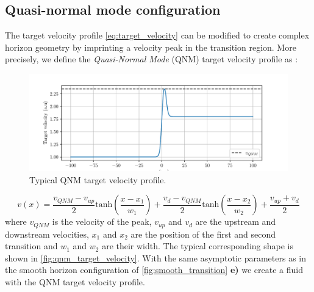 \subsection{Quasi-normal mode configuration}

The target velocity profile \autoref{eq:target_velocity} can be modified to create complex horizon geometry by imprinting 
a velocity peak in the transition region. More precisely, we define the \textit{Quasi-Normal Mode} (QNM) target velocity profile as :

\begin{figure}
    \centering
    \includegraphics[width=1\textwidth]{chap_custom_st/fig/qnm_target_velocity.pdf}
    \caption{Typical QNM target velocity profile.}
    \label{fig:qnm_target_velocity}
\end{figure}


\begin{equation}
    v(x)= \frac{v_{QNM}-v_{up}}{2}\mathrm{tanh}(\frac{x-x_1}{w_1})+ \frac{v_{d}-v_{QNM}}{2}\mathrm{tanh}(\frac{x-x_2}{w_2})+\frac{v_{up}+v_{d}}{2}
    \label{eq:target_velocity_qnm}
\end{equation}
where $v_{QNM}$ is the velocity of the peak, $v_{up}$ and $v_{d}$ are the upstream and downstream velocities, $x_1$ and $x_2$ are the position of the first and second transition and $w_1$ and $w_2$ are their width.
The typical corresponding shape is shown in \autoref{fig:qnm_target_velocity}.
With the same asymptotic parameters as in the smooth horizon configuration of \autoref{fig:smooth_transition} \textbf{e)} we create a fluid with the QNM target velocity profile.


